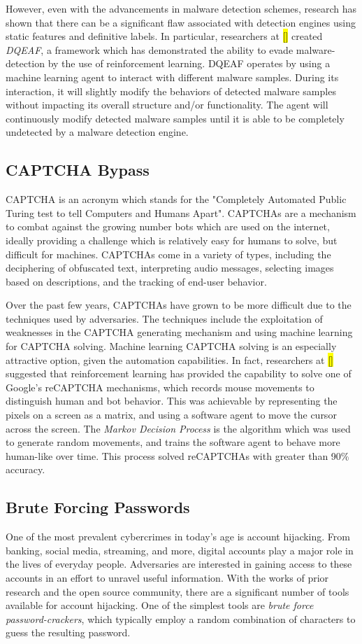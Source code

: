 \documentclass[11pt,conference]{IEEEtran}
\begin{document}
However, even with the advancements in malware detection schemes, research
has shown that there can be a significant flaw associated with detection
engines using static features and definitive labels. In particular, researchers
at \hl{[]} created \emph{DQEAF}, a framework which has demonstrated the ability to evade malware-detection by
the use of reinforcement learning. DQEAF operates by using a machine
learning agent to interact with different malware samples. During its
interaction, it will slightly modify the behaviors of detected malware samples
without impacting its overall structure and/or functionality. The agent will
continuously modify detected malware samples until it is able to be completely
undetected by a malware detection engine.

\subsection{CAPTCHA Bypass}
CAPTCHA is an acronym which stands for the "Completely Automated Public Turing test
to tell Computers and Humans Apart". CAPTCHAs are a 
mechanism to combat against the growing number bots which are used on the
internet, ideally providing a challenge which is relatively easy for humans to
solve, but difficult for machines. CAPTCHAs come in a variety of types,
including the deciphering of obfuscated text, interpreting audio messages,
selecting images based on descriptions, and the tracking of end-user behavior.

Over the past few years, CAPTCHAs have grown to be more difficult due to the
techniques used by adversaries. The techniques include the exploitation of
weaknesses in the CAPTCHA generating mechanism
and using machine learning for CAPTCHA solving. Machine learning
CAPTCHA solving is an especially attractive option, given the automation
capabilities. In fact, researchers at \hl{[]} suggested that reinforcement learning has
provided the capability to solve one of Google's reCAPTCHA mechanisms, which
records mouse movements to distinguish human and bot behavior. This was
achievable by representing the pixels on a screen as a matrix, and using a
software agent to move the
cursor across the screen. The \emph{Markov
Decision Process} is the algorithm which was used to generate random movements,
and trains the software agent to behave more human-like over time. This
process solved reCAPTCHAs with greater than 90\% accuracy.

\subsection{Brute Forcing Passwords}
One of the most prevalent cybercrimes in today's age is account hijacking. From
banking, social media, streaming, and more, digital accounts play a major role
in the lives of everyday people. Adversaries are interested in
gaining access to these accounts in an effort to unravel useful information.
With the works of prior research and the open source community, there are a
significant number of tools available for account hijacking. One of the
simplest tools are \emph{brute force password-crackers}, which typically employ a random
combination of characters to guess the resulting password.
\end{document}

